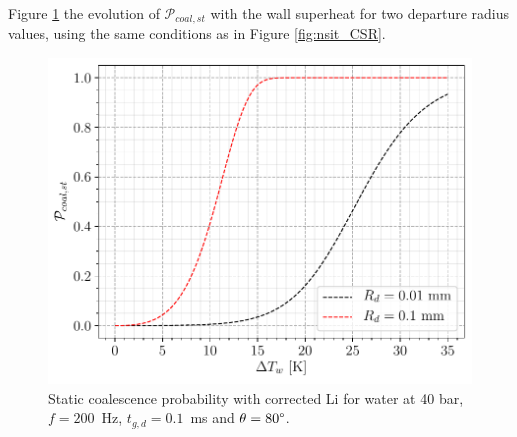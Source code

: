 Figure \ref{fig:pcoal_st} the evolution of $\mathcal{P}_{coal,st}$ with the wall superheat for two departure radius values, using the same conditions as in Figure \ref{fig:nsit_CSR}.

\begin{figure}[!h]
\centering
\includegraphics[width=0.6\linewidth]{img/site_interaction/P_coal_st.pdf}
\caption{Static coalescence probability with corrected Li \etal for water at 40 bar, $f=200$~Hz, $t_{g,d} = 0.1$~ms and $\theta=80\degree$.}
\label{fig:pcoal_st}
\end{figure}

